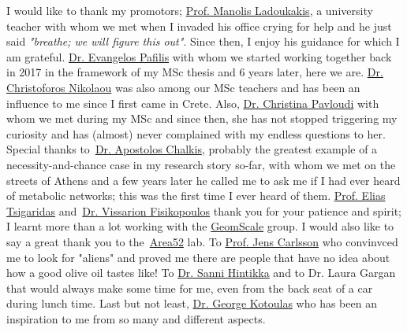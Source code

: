 \documentclass[master=elt, cleveref, autoref, masteroption=eg]{kulemt}
\begin{document}
\begin{preface}
   I would like to thank my promotors;
   \href{https://ladoukakis.weebly.com/}{Prof. Manolis Ladoukakis}, 
   a university teacher 
   with whom we met
   when I invaded his office crying for help and he just said
   \textit{"breathe; we will figure this out"}. 
   Since then, I enjoy his guidance for which I am grateful. 
   \href{http://lab42open.hcmr.gr/}{Dr. Evangelos Pafilis} with whom we started working together back in 2017 in 
   the framework of my MSc thesis 
   and 6 years later, here we are. 
   \href{http://computational-genomics.weebly.com/}{Dr. Christoforos Nikolaou} was also among our MSc teachers
   and has been an influence to me since I first came in Crete.
   Also, \href{https://cpavloud.github.io/mysite/}{Dr. Christina Pavloudi} with whom we met during my MSc and since then, she has
   not stopped triggering my curiosity and has (almost) never complained with my endless questions to her.
   Special thanks to~\href{https://tolischal.github.io/}{Dr. Apostolos Chalkis}, 
   probably the greatest example of a necessity-and-chance case in my research story so-far, 
   with whom we met on the streets of Athens 
   and a few years later he called me to ask me if I had ever heard of metabolic networks; 
   this was the first time I ever heard of them.
   \href{https://who.paris.inria.fr/Elias.Tsigaridas/}{Prof. Elias Tsigaridas} 
   and~\href{https://who.paris.inria.fr/Elias.Tsigaridas/}{Dr. Vissarion Fisikopoulos} 
   thank you for your patience and spirit; 
   I learnt more than a lot working with the \href{https://geomscale.github.io/}{GeomScale} group. 
   I would also like to say a great thank you to the~\href{https://sites.google.com/view/lab-area52/home}{Area52} lab. 
   To \href{https://sites.google.com/view/lab-area52/home/meet-the-team?authuser=0#h.p_TlJiVLurzMia}{Prof. Jens Carlsson} 
   who convinvced me to look for "aliens" and proved me there are people that have no idea
   about how a good olive oil tastes like! 
   To \href{https://www.researchgate.net/profile/Sanni-Hintikka}{Dr. Sanni Hintikka}
   and to Dr. Laura Gargan that would always make some time for me, even from the back seat of a car during lunch time.
   Last but not least, \href{https://imbbc.hcmr.gr/user/kotoulas/}{Dr. George Kotoulas} who has been an inspiration to me from so many and different aspects.


\end{preface}
\end{document}
